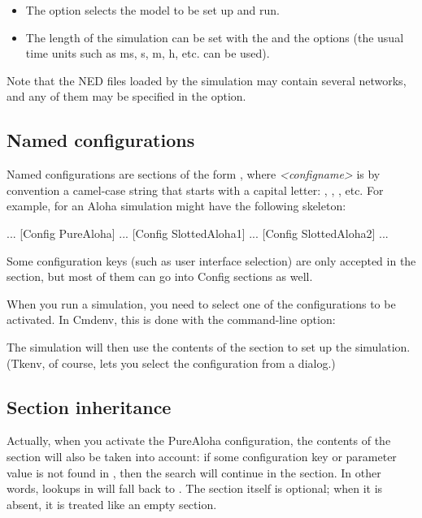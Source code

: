\begin{itemize}
  \item{The  option selects the model to be set up and run.}
  \item{The length of the simulation can be set with the
     and the  options (the
    usual time units such as ms, s, m, h, etc. can be used).}
\end{itemize}

Note that the NED files loaded by the simulation may contain several
networks, and any of them may be specified in the 
option.


\subsection{Named configurations}

Named configurations are sections of the form , where
\textit{<configname>} is by convention a camel-case string that starts with a capital letter:
, , , etc. For example,
 for an Aloha simulation might have the following skeleton:

\begin{inifile}
[General]
...
[Config PureAloha]
...
[Config SlottedAloha1]
...
[Config SlottedAloha2]
...
\end{inifile}

Some configuration keys (such as user interface selection) are only
accepted in the \ttt{[General]} section, but most of them can go into Config
sections as well.

When you run a simulation, you need to select one of the configurations
to be activated. In Cmdenv, this is done with the  command-line option:


The simulation will then use the contents of the 
section to set up the simulation. (Tkenv, of course, lets you select
the configuration from a dialog.)


\subsection{Section inheritance}

Actually, when you activate the PureAloha configuration, the contents of
the \ttt{[General]} section will also be taken into account: if some
configuration key or parameter value is not found in ,
then the search will continue in the \ttt{[General]} section. In
other words, lookups in  will fall back to \ttt{[General]}.
The \ttt{[General]} section itself is optional; when it is absent, it is
treated like an empty \ttt{[General]} section.

